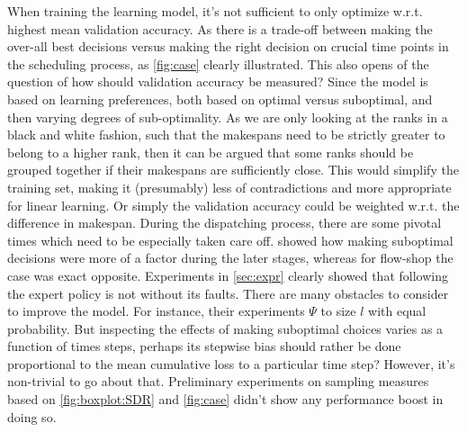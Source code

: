 \documentclass[smallextended]{svjour3}
\begin{document}
When training the learning model, it's not sufficient to only optimize w.r.t. 
highest mean validation accuracy. As there is a trade-off between making the 
over-all best decisions versus making the right decision on crucial time points 
in the scheduling process, as \cref{fig:case} clearly illustrated. 
This also opens of the question of how should validation accuracy be measured? 
Since the model is based on learning preferences, both based on optimal versus 
suboptimal, and then varying degrees of sub-optimality. As we are only looking 
at the ranks in a black and white fashion, such that the makespans need to be 
strictly greater to belong to a higher rank, then it can be argued that some 
ranks should be grouped together if their makespans are sufficiently close. 
This would simplify the training set, making it (presumably) less of 
contradictions and more appropriate for linear learning. Or simply the 
validation accuracy could be weighted w.r.t. the  difference in 
makespan.
During the dispatching process, there are some pivotal times which need to be 
especially taken care off.  showed how making suboptimal 
decisions were more of a factor during the later stages, whereas for flow-shop 
the case was exact opposite. 
Experiments in \cref{sec:expr} clearly showed that following the expert policy 
is not without its faults. There are many obstacles to consider to improve the 
model. For instance, their experiments $\Psi$ to size $l$ with equal 
probability. But inspecting the effects of making suboptimal choices varies as 
a function of times steps, perhaps its stepwise bias should rather be done 
proportional to the mean cumulative loss to a particular time step? 
However, it's non-trivial to go about that. Preliminary experiments on sampling 
measures based on \cref{fig:boxplot:SDR} and \cref{fig:case} didn't show any 
performance boost in doing so.
\end{document}
